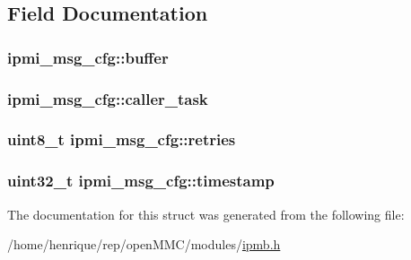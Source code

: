 \subsection{Field Documentation}
\hypertarget{structipmi__msg__cfg_a87e003a735fb94cbba3f6fae2c818d73}{
\subsubsection[{buffer}]{ ipmi\-\_\-msg\-\_\-cfg\-::buffer}}\label{structipmi__msg__cfg_a87e003a735fb94cbba3f6fae2c818d73}
\hypertarget{structipmi__msg__cfg_a4abb25bcfeca6a90de727455ffc34547}{
\subsubsection[{caller\-\_\-task}]{ ipmi\-\_\-msg\-\_\-cfg\-::caller\-\_\-task}}\label{structipmi__msg__cfg_a4abb25bcfeca6a90de727455ffc34547}
\hypertarget{structipmi__msg__cfg_a1eb8c7427ffd1b308c05a0df8baed6fb}{
\subsubsection[{retries}]{\setlength{\rightskip}{0pt plus 5cm}uint8\-\_\-t ipmi\-\_\-msg\-\_\-cfg\-::retries}}\label{structipmi__msg__cfg_a1eb8c7427ffd1b308c05a0df8baed6fb}
\hypertarget{structipmi__msg__cfg_af6950ff8da9cb798d67299557d311545}{
\subsubsection[{timestamp}]{\setlength{\rightskip}{0pt plus 5cm}uint32\-\_\-t ipmi\-\_\-msg\-\_\-cfg\-::timestamp}}\label{structipmi__msg__cfg_af6950ff8da9cb798d67299557d311545}


The documentation for this struct was generated from the following file\-:\begin{DoxyCompactItemize}
\item 
/home/henrique/rep/open\-M\-M\-C/modules/\hyperlink{ipmb_8h}{ipmb.\-h}\end{DoxyCompactItemize}
